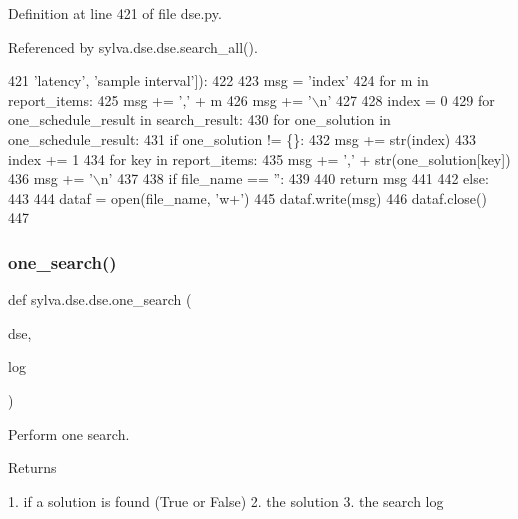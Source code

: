 Definition at line 421 of file dse.\+py.



Referenced by sylva.\+dse.\+dse.\+search\+\_\+all().


\begin{DoxyCode}
421                                  \textcolor{stringliteral}{'latency'}, \textcolor{stringliteral}{'sample interval'}]):
422 
423     msg = \textcolor{stringliteral}{'index'}
424     \textcolor{keywordflow}{for} m \textcolor{keywordflow}{in} report\_items:
425         msg += \textcolor{stringliteral}{','} + m
426     msg += \textcolor{stringliteral}{'\(\backslash\)n'}
427 
428     index = 0
429     \textcolor{keywordflow}{for} one\_schedule\_result \textcolor{keywordflow}{in} search\_result:
430         \textcolor{keywordflow}{for} one\_solution \textcolor{keywordflow}{in} one\_schedule\_result:
431             \textcolor{keywordflow}{if} one\_solution != \{\}:
432                 msg += str(index)
433                 index += 1
434                 \textcolor{keywordflow}{for} key \textcolor{keywordflow}{in} report\_items:
435                     msg += \textcolor{stringliteral}{','} + str(one\_solution[key])
436                 msg += \textcolor{stringliteral}{'\(\backslash\)n'}
437 
438     \textcolor{keywordflow}{if} file\_name == \textcolor{stringliteral}{''}:
439 
440         \textcolor{keywordflow}{return} msg
441 
442     \textcolor{keywordflow}{else}:
443 
444         dataf = open(file\_name, \textcolor{stringliteral}{'w+'})
445         dataf.write(msg)
446         dataf.close()
447 \end{DoxyCode}
\mbox{\label{namespacesylva_1_1dse_1_1dse_a27653b05dda8ab9dab8aa948db5b860a}} 
\subsubsection{\texorpdfstring{one\+\_\+search()}{one\_search()}}
{\footnotesize\ttfamily def sylva.\+dse.\+dse.\+one\+\_\+search (\begin{DoxyParamCaption}\item[{}]{dse,  }\item[{}]{log }\end{DoxyParamCaption})}

\begin{DoxyVerb}Perform one search.

Returns

1. if a solution is found (True or False)
2. the solution
3. the search log
\end{DoxyVerb}
 

